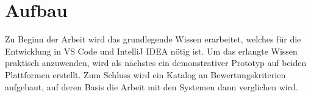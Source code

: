 \section{Aufbau}
\label{sec:Aufbau}

Zu Beginn der Arbeit wird das grundlegende Wissen erarbeitet,
welches für die Entwicklung in VS Code und IntelliJ IDEA nötig ist.
Um das erlangte Wissen praktisch anzuwenden, wird als nächstes ein
demonstrativer Prototyp auf beiden Plattformen erstellt.
Zum Schluss wird ein Katalog an Bewertungskriterien aufgebaut,
auf deren Basis die Arbeit mit den Systemen dann verglichen wird.